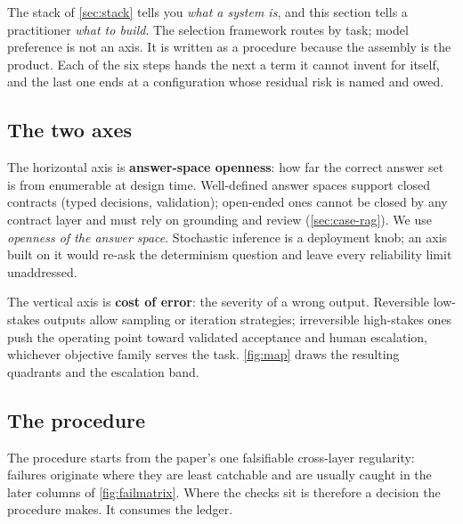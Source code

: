 The stack of \cref{sec:stack} tells you \emph{what a system is}, and this section tells a
practitioner \emph{what to build}. The selection framework routes by task; model preference is not
an axis. It is written as a
procedure because the assembly is the product. Each of the six steps hands the next a term it
cannot invent for itself, and the last one ends at a configuration whose residual risk is named
and owed.

\subsection{The two axes}
\label{sec:sel-axes}
The horizontal axis is \textbf{answer-space openness}: how far the correct answer set is from
enumerable at design time. Well-defined answer spaces support closed contracts (typed
decisions, validation); open-ended ones cannot be closed by any contract layer and must rely
on grounding and review (\cref{sec:case-rag}). We use \emph{openness of the
answer space}. Stochastic inference is a deployment knob; an axis built on it would re-ask the
determinism question and leave every reliability limit unaddressed.

The vertical axis is \textbf{cost of error}: the severity of a wrong output. Reversible low-stakes
outputs allow sampling or iteration strategies; irreversible high-stakes ones push the operating
point toward validated acceptance and human escalation, whichever objective family serves the
task. \cref{fig:map} draws the resulting quadrants and the escalation band.

\subsection{The procedure}
\label{sec:sel-procedure}
The procedure starts from the paper's one falsifiable cross-layer regularity: failures originate
where they are least catchable and are usually caught in the later columns of
\cref{fig:failmatrix}. Where the checks sit is therefore a decision the procedure makes. It
consumes the ledger.

